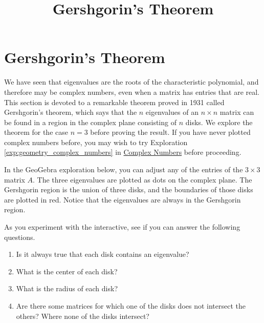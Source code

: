 \documentclass{ximera}
\title{Gershgorin's Theorem} \license{CC BY-NC-SA 4.0}
\begin{document}
\begin{abstract}
\end{abstract}
\maketitle

\section*{Gershgorin's Theorem}
We have seen that eigenvalues are the roots of the characteristic polynomial, and therefore may be complex numbers, even when a matrix has entries that are real.  This section is devoted to a remarkable theorem proved in 1931 called Gershgorin's theorem, which says that the $n$ eigenvalues of an $n \times n$ matrix can be found in a region in the complex plane consisting of $n$ disks.  We explore the theorem for the case $n=3$ before proving the result.  If you have never plotted complex numbers before, you may wish to try Exploration \ref{exp:geometry_complex_numbers} in \href{https://ximera.osu.edu/oerlinalg/LinearAlgebra/APX-0020/main}{Complex Numbers} before proceeding.

\begin{exploration}\label{init:GershDisks3x3}
In the GeoGebra exploration below, you can adjust any of the entries of the $3 \times 3$ matrix $A$.  The three eigenvalues are plotted as dots on the complex plane.  The Gershgorin region is the union of three disks, and the boundaries of those disks are plotted in red.  Notice that the eigenvalues are always in the Gershgorin region.

As you experiment with the interactive, see if you can answer the following questions.

\begin{enumerate}
    \item Is it always true that each disk contains an eigenvalue?  
    \item What is the center of each disk?
    \item What is the radius of each disk?
    \item Are there some matrices for which one of the disks does not intersect the others?  Where none of the disks intersect?
\end{enumerate}
\begin{center}
\end{center}
\end{exploration}
\end{document}
